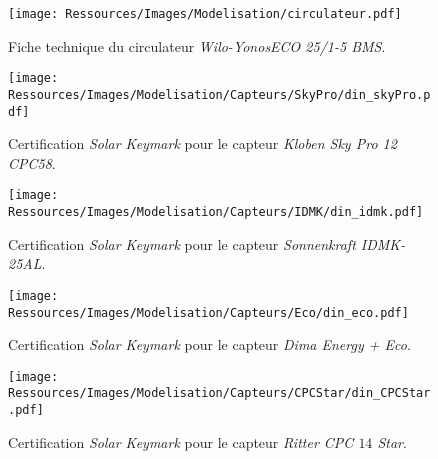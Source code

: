 
\begin{figure}
    \centering
    \texttt{[image: Ressources/Images/Modelisation/circulateur.pdf]}
    \caption{Fiche technique du circulateur \textit{Wilo-YonosECO 25/1-5 BMS}.
             \label{fig:caracs_pompes}}
\end{figure}

\begin{figure}
    \centering
    \texttt{[image: Ressources/Images/Modelisation/Capteurs/SkyPro/din\_skyPro.pdf]}
    \caption{Certification \textit{Solar Keymark} pour le capteur \textit{Kloben Sky Pro 12 CPC58}.
             \label{fig:caracs_skypro}}
\end{figure}


\begin{figure}
    \centering
    \texttt{[image: Ressources/Images/Modelisation/Capteurs/IDMK/din\_idmk.pdf]}
    \caption{Certification \textit{Solar Keymark} pour le capteur \textit{Sonnenkraft IDMK-25AL}.
             \label{fig:caracs_idmk}}
\end{figure}


\begin{figure}
    \centering
    \texttt{[image: Ressources/Images/Modelisation/Capteurs/Eco/din\_eco.pdf]}
    \caption{Certification \textit{Solar Keymark} pour le capteur \textit{Dima Energy + Eco}.
             \label{fig:caracs_eco}}
\end{figure}


\begin{figure}
    \centering
    \texttt{[image: Ressources/Images/Modelisation/Capteurs/CPCStar/din\_CPCStar.pdf]}
    \caption{Certification \textit{Solar Keymark} pour le capteur \textit{Ritter CPC $14$ Star}.
             \label{fig:caracs_star}}
\end{figure}
